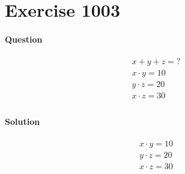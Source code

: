 \documentclass{article}
\begin{document}


\section{Exercise 1003}

\paragraph{Question}
\begin{align*}
	x + y + z = ?  \\
	x \cdot y = 10 \\
	y \cdot z = 20 \\
	x \cdot z = 30 \\
\end{align*}

\paragraph{Solution}
\begin{align*}
	x \cdot y = 10 \\
	y \cdot z = 20 \\
	x \cdot z = 30 \\
\end{align*}

\end{document}
